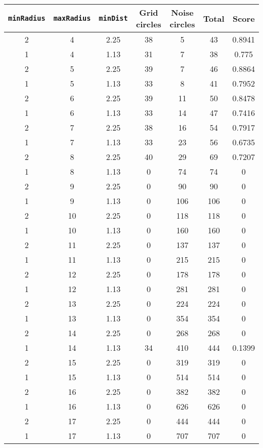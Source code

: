 \documentclass[letterpaper, 12pt]{article}
\begin{document}
\begin{longtable}{|c|c|c|c|c|c|c|}
\hline
\textbf{\texttt{minRadius}} & \textbf{\texttt{maxRadius}} & \textbf{\texttt{minDist}} & \textbf{Grid circles} & \textbf{Noise circles} & \textbf{Total} & \textbf{Score} \\
\hline
2 & 4 & 2.25 & 38 & 5 & 43 & 0.8941 \\
\hline
1 & 4 & 1.13 & 31 & 7 & 38 & 0.775 \\
\hline
2 & 5 & 2.25 & 39 & 7 & 46 & 0.8864 \\
\hline
1 & 5 & 1.13 & 33 & 8 & 41 & 0.7952 \\
\hline
2 & 6 & 2.25 & 39 & 11 & 50 & 0.8478 \\
\hline
1 & 6 & 1.13 & 33 & 14 & 47 & 0.7416 \\
\hline
2 & 7 & 2.25 & 38 & 16 & 54 & 0.7917 \\
\hline
1 & 7 & 1.13 & 33 & 23 & 56 & 0.6735 \\
\hline
2 & 8 & 2.25 & 40 & 29 & 69 & 0.7207 \\
\hline
1 & 8 & 1.13 & 0 & 74 & 74 & 0 \\
\hline
2 & 9 & 2.25 & 0 & 90 & 90 & 0 \\
\hline
1 & 9 & 1.13 & 0 & 106 & 106 & 0 \\
\hline
2 & 10 & 2.25 & 0 & 118 & 118 & 0 \\
\hline
1 & 10 & 1.13 & 0 & 160 & 160 & 0 \\
\hline
2 & 11 & 2.25 & 0 & 137 & 137 & 0 \\
\hline
1 & 11 & 1.13 & 0 & 215 & 215 & 0 \\
\hline
2 & 12 & 2.25 & 0 & 178 & 178 & 0 \\
\hline
1 & 12 & 1.13 & 0 & 281 & 281 & 0 \\
\hline
2 & 13 & 2.25 & 0 & 224 & 224 & 0 \\
\hline
1 & 13 & 1.13 & 0 & 354 & 354 & 0 \\
\hline
2 & 14 & 2.25 & 0 & 268 & 268 & 0 \\
\hline
1 & 14 & 1.13 & 34 & 410 & 444 & 0.1399 \\
\hline
2 & 15 & 2.25 & 0 & 319 & 319 & 0 \\
\hline
1 & 15 & 1.13 & 0 & 514 & 514 & 0 \\
\hline
2 & 16 & 2.25 & 0 & 382 & 382 & 0 \\
\hline
1 & 16 & 1.13 & 0 & 626 & 626 & 0 \\
\hline
2 & 17 & 2.25 & 0 & 444 & 444 & 0 \\
\hline
1 & 17 & 1.13 & 0 & 707 & 707 & 0 \\

\end{longtable}
\end{document}
